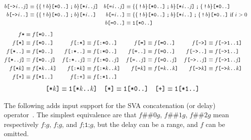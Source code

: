 \documentclass[a4paper,twoside,10pt,DIV=12]{scrreprt}
\DeclareMathOperator{\NOT}{\texttt{!}}
\newcommand{\FUSION}{\mathbin{\texttt{:}}}
\newcommand{\CONCAT}{\mathbin{\texttt{;}}}
\newcommand{\DELAY}[1]{\mathbin{\texttt{\#\##1}}}
\newcommand{\0}{\texttt{0}}
\newcommand{\1}{\texttt{1}}
\newcommand{\STAR}[1]{\texttt{[*#1]}}
\newcommand{\FSTAR}[1]{\texttt{[:*#1]}}
\newcommand{\STARALT}{\texttt{*}}
\newcommand{\EQUAL}[1]{\texttt{[=#1]}}
\newcommand{\GOTO}[1]{\texttt{[->#1]}}
\newcommand{\PLUS}{\texttt{[+]}}
\newcommand{\FPLUS}{\texttt{[:+]}}
\newcommand\mvar[1]{\ensuremath{\mathit{#1}}}
\begin{document}
\begin{align*}
  b\GOTO{\mvar{i}..\mvar{j}} &\equiv \mathtt{\{\{}\NOT b\mathtt{\}}\STAR{0..}\CONCAT b\mathtt{\}}\STAR{\mvar{i}..\mvar{j}} &
  b\EQUAL{\mvar{i}..\mvar{j}} &\equiv \mathtt{\{\{}\NOT b\mathtt{\}}\STAR{0..}\CONCAT b\mathtt{\}}\STAR{\mvar{i}..\mvar{j}}\CONCAT \mathtt{\{}\NOT b\mathtt{\}}\STAR{0..} \\
  b\GOTO{\mvar{i}..} &\equiv \mathtt{\{\{}\NOT b\mathtt{\}}\STAR{0..}\CONCAT b\mathtt{\}}\STAR{\mvar{i}..} &
  b\EQUAL{\mvar{i}..} &\equiv \mathtt{\{\{}\NOT b\mathtt{\}}\STAR{0..}\CONCAT b\mathtt{\}}\STAR{\mvar{i}..}\CONCAT \mathtt{\{}\NOT b\mathtt{\}}\STAR{0..}\text{~if~}i>0 \\
  && b\EQUAL{0..} &\equiv \1\STAR{0..}
\end{align*}
\begin{align*}
  f\STARALT &\equiv f\STAR{0..}\\
  f\STAR{}    &\equiv f\STAR{0..}  &
  f\FSTAR{}    &\equiv f\FSTAR{0..}  &
  f\EQUAL{}   &\equiv f\EQUAL{0..} &
  f\GOTO{}   &\equiv f\GOTO{1..1} \\
  f\STAR{..}  &\equiv f\STAR{0..}  &
  f\FSTAR{..}  &\equiv f\FSTAR{0..}  &
  f\EQUAL{..}  &\equiv f\EQUAL{0..} &
  f\GOTO{..}  &\equiv f\GOTO{1..} \\
  f\STAR{..\mvar{j}} &\equiv f\STAR{0..\mvar{j}} &
  f\FSTAR{..\mvar{j}} &\equiv f\FSTAR{0..\mvar{j}} &
  f\EQUAL{..\mvar{j}} &\equiv f\EQUAL{0..\mvar{j}} &
  f\GOTO{..\mvar{j}} &\equiv f\GOTO{1..\mvar{j}} \\
  f\STAR{\mvar{k}}  &\equiv f\STAR{\mvar{k}..\mvar{k}}  &
  f\FSTAR{\mvar{k}}  &\equiv f\FSTAR{\mvar{k}..\mvar{k}}  &
  f\EQUAL{\mvar{k}}   &\equiv f\EQUAL{\mvar{k}..\mvar{k}} &
  f\GOTO{\mvar{k}}   &\equiv f\GOTO{\mvar{k}..\mvar{k}} \\
  f\PLUS{}    &\equiv f\STAR{1..} &
  f\FPLUS{}    &\equiv f\FSTAR{1..}
\end{align*}
\begin{align*}
\STAR{\mvar{k}}    &\equiv \1\STAR{\mvar{k}..\mvar{k}} &
\STAR{}    &\equiv \1\STAR{0..} &
\PLUS{}    &\equiv \1\STAR{1..}
\end{align*}

The following adds input support for the SVA concatenation (or delay)
operator~\cite{systemverilog.18.std}.  The simplest equivalence are
that $f \DELAY{0} g$, $f \DELAY{1} g$, $f \DELAY{2} g$ mean
respectively $f \FUSION g$, $f \CONCAT g$, and
$f \CONCAT \1\CONCAT g$, but the delay can be a range, and $f$ can be
omitted.
\end{document}
